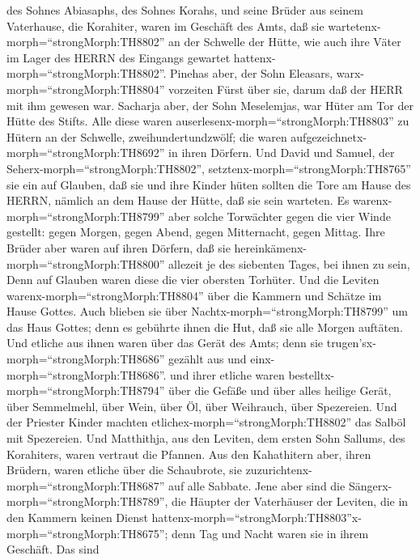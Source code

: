 des Sohnes Abiasaphs, des Sohnes Korahs, und seine Brüder aus seinem
Vaterhause, die Korahiter, waren im Geschäft des Amts, daß sie
wartetenx-morph=``strongMorph:TH8802'' an der Schwelle der Hütte, wie
auch ihre Väter im Lager des HERRN des Eingangs gewartet
hattenx-morph=``strongMorph:TH8802''.  Pinehas aber, der
Sohn Eleasars, warx-morph=``strongMorph:TH8804'' vorzeiten Fürst über
sie, darum daß der HERR mit ihm gewesen war.  Sacharja
aber, der Sohn Meselemjas, war Hüter am Tor der Hütte des Stifts.
 Alle diese waren auserlesenx-morph=``strongMorph:TH8803''
zu Hütern an der Schwelle, zweihundertundzwölf; die waren
aufgezeichnetx-morph=``strongMorph:TH8692'' in ihren Dörfern. Und David
und Samuel, der Seherx-morph=``strongMorph:TH8802'',
setztenx-morph=``strongMorph:TH8765'' sie ein auf Glauben, 
daß sie und ihre Kinder hüten sollten die Tore am Hause des HERRN,
nämlich an dem Hause der Hütte, daß sie sein warteten.  Es
warenx-morph=``strongMorph:TH8799'' aber solche Torwächter gegen die
vier Winde gestellt: gegen Morgen, gegen Abend, gegen Mitternacht, gegen
Mittag.  Ihre Brüder aber waren auf ihren Dörfern, daß sie
hereinkämenx-morph=``strongMorph:TH8800'' allezeit je des siebenten
Tages, bei ihnen zu sein,  Denn auf Glauben waren diese die
vier obersten Torhüter. Und die Leviten
warenx-morph=``strongMorph:TH8804'' über die Kammern und Schätze im
Hause Gottes.  Auch blieben sie über
Nachtx-morph=``strongMorph:TH8799'' um das Haus Gottes; denn es gebührte
ihnen die Hut, daß sie alle Morgen auftäten.  Und etliche
aus ihnen waren über das Gerät des Amts; denn sie
trugen'sx-morph=``strongMorph:TH8686'' gezählt aus und
einx-morph=``strongMorph:TH8686''.  und ihrer etliche waren
bestelltx-morph=``strongMorph:TH8794'' über die Gefäße und über alles
heilige Gerät, über Semmelmehl, über Wein, über Öl, über Weihrauch, über
Spezereien.  Und der Priester Kinder machten
etlichex-morph=``strongMorph:TH8802'' das Salböl mit Spezereien.
 Und Matthithja, aus den Leviten, dem ersten Sohn Sallums,
des Korahiters, waren vertraut die Pfannen.  Aus den
Kahathitern aber, ihren Brüdern, waren etliche über die Schaubrote, sie
zuzurichtenx-morph=``strongMorph:TH8687'' auf alle Sabbate.
 Jene aber sind die Sängerx-morph=``strongMorph:TH8789'',
die Häupter der Vaterhäuser der Leviten, die in den Kammern keinen
Dienst
hattenx-morph=``strongMorph:TH8803''\textbar x-morph=``strongMorph:TH8675'';
denn Tag und Nacht waren sie in ihrem Geschäft.  Das sind
